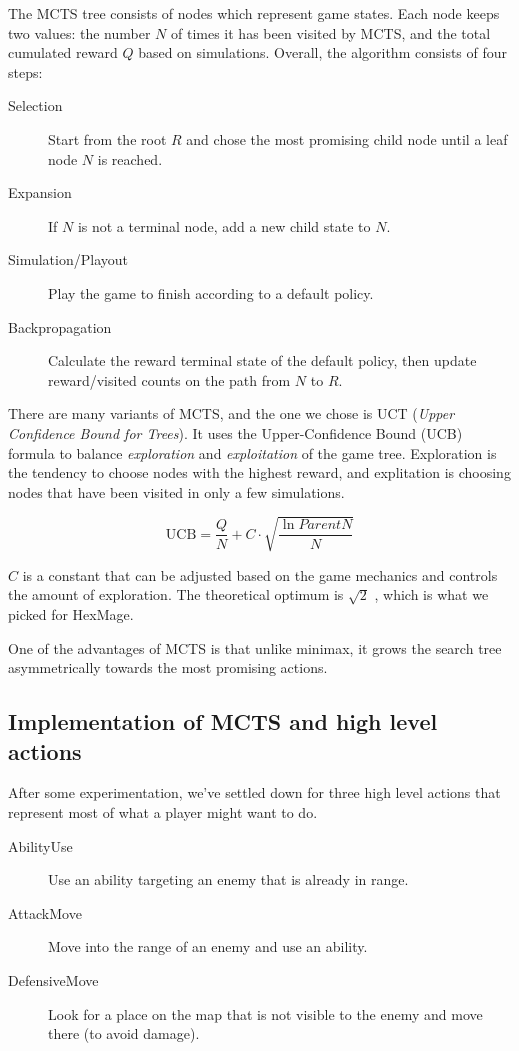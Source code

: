 The MCTS tree consists of nodes which represent game states. Each node keeps two values: the number $N$ of times
it has been visited by MCTS, and the total cumulated reward $Q$ based on simulations. Overall, the algorithm consists of four steps:

\begin{description}
	\item[Selection] Start from the root $R$ and chose the most promising child node until a leaf node $N$ is reached.
	\item[Expansion] If $N$ is not a terminal node, add a new child state to $N$.
	\item[Simulation/Playout] Play the game to finish according to a default policy.
	\item[Backpropagation] Calculate the reward terminal state of the default policy, then update reward/visited counts on the path from $N$ to $R$.
\end{description}

There are many variants of MCTS, and the one we chose is UCT (\emph{Upper Confidence Bound for Trees}). It uses the Upper-Confidence Bound (UCB) formula to balance \emph{exploration} and \emph{exploitation} of the game tree. Exploration is the tendency to choose nodes with the highest reward, and explitation is choosing nodes that have been visited in only a few simulations.

\begin{equation}
	\text{UCB} = \frac{Q}{N} + C \cdot \sqrt{\frac{\ln ParentN}{N}}	
\end{equation}

$C$ is a constant that can be adjusted based on the game mechanics and controls the amount of exploration. The theoretical optimum is $\sqrt{2}$ \citep{mcts-survey}, which is what we picked for HexMage.

One of the advantages of MCTS is that unlike minimax, it grows the search tree asymmetrically towards
the most promising actions.

\subsection{Implementation of MCTS and high level actions}

After some experimentation, we've settled down for three high level actions
that represent most of what a player might want to do.

\begin{description}
\item [AbilityUse] Use an ability targeting an enemy that is already in range.
\item [AttackMove] Move into the range of an enemy and use an ability.
\item [DefensiveMove] Look for a place on the map that is not visible to the enemy and move there (to avoid damage).
\end{description}

